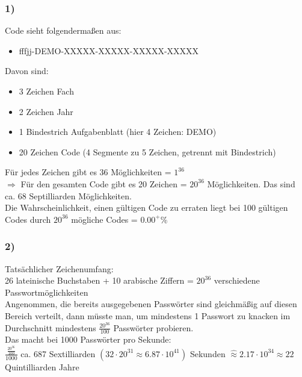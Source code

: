 \documentclass{article}
\begin{document}
\subsubsection*{1)}
Code sieht folgendermaßen aus:
\begin{itemize}
    \item fffjj-DEMO-XXXXX-XXXXX-XXXXX-XXXXX
\end{itemize}
Davon sind:
\begin{itemize}
    \item 3 Zeichen Fach
    \item 2  Zeichen Jahr
    \item 1 Bindestrich Aufgabenblatt (hier 4 Zeichen: DEMO)
    \item 20 Zeichen Code (4 Segmente zu 5 Zeichen, getrennt mit Bindestrich)
\end{itemize}
Für jedes Zeichen gibt es 36 Möglichkeiten = $1^{36}$\\
$\Rightarrow$ Für den gesamten Code gibt es 20 Zeichen = $20^{36}$ Möglichkeiten.
Das sind ca. 68 Septilliarden Möglichkeiten.\\
Die Wahrscheinlichkeit, einen gültigen Code zu erraten liegt bei 100 gültigen Codes durch $20^{36}$ mögliche Codes = $0.00^+$\%
\subsubsection*{2)}
Tatsächlicher Zeichenumfang:\\
26 lateinische Buchstaben + 10 arabische Ziffern
= $20^{36}$ verschiedene Passwortmöglichkeiten\\
Angenommen, die bereits ausgegebenen Passwörter sind gleichmäßig auf diesen Bereich verteilt, dann müsste man, um mindestens 1 Passwort zu knacken im Durchschnitt mindestens $\frac{20^{36}}{100}$ Passwörter probieren.\\
Das macht bei 1000 Passwörter pro Sekunde:\\
$\frac{\frac{20^{36}}{100}}{1000}$ ca. 687 Sextilliarden $(32\cdot20^{31}\approx6.87\cdot10^{41})$ Sekunden $\widehat{\approx} 2.17\cdot10^{34}\approx22$ Quintilliarden Jahre\\
\newpage
\end{document}

